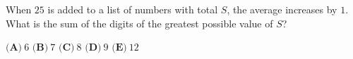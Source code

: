 When $25$ is added to a list of numbers with total $S$, the average increases by $1$. What is the sum of the digits of the greatest possible value of $S$?

$\textbf{(A)}\ $$6$ \qquad $\textbf{(B)}\ $$7$ \qquad $\textbf{(C)}\ $$8$ \qquad $\textbf{(D)}\ $$9$ \qquad $\textbf{(E)}\ $$12$
